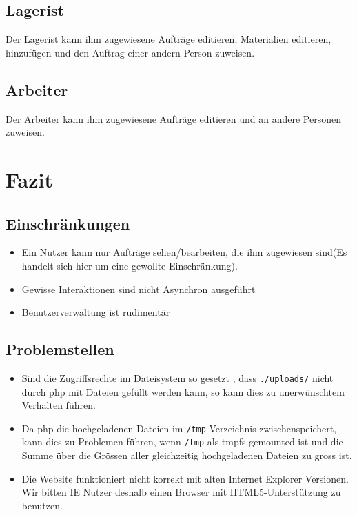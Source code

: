 \documentclass[ngerman, 12pt, pdftex]{scrartcl}[2006/07/30]
\begin{document}
\subsection{Lagerist}
Der Lagerist kann ihm zugewiesene Aufträge editieren, Materialien editieren, hinzufügen und den Auftrag einer andern Person zuweisen.


\subsection{Arbeiter}
Der Arbeiter kann ihm zugewiesene Aufträge editieren und an andere Personen zuweisen.


\section{Fazit}
\subsection{Einschränkungen}
\begin{itemize}
\item Ein Nutzer kann nur Aufträge sehen/bearbeiten, die ihm zugewiesen sind(Es handelt sich hier um eine gewollte Einschränkung).
\item Gewisse Interaktionen sind nicht Asynchron ausgeführt
\item Benutzerverwaltung ist rudimentär
\end{itemize}


\subsection{Problemstellen}
\begin{itemize}
\item Sind die Zugriffsrechte im Dateisystem so gesetzt , dass \verb+./uploads/+ nicht durch php mit Dateien gefüllt werden kann, so kann dies zu unerwünschtem Verhalten führen.
\item Da php die hochgeladenen Dateien im \verb+/tmp+ Verzeichnis zwischenspeichert, kann dies zu Problemen führen, wenn \verb+/tmp+ als tmpfs gemounted ist und die Summe über die Grössen aller gleichzeitig hochgeladenen Dateien zu gross ist.
\item Die Website funktioniert nicht korrekt mit alten Internet Explorer Versionen. Wir bitten IE Nutzer deshalb einen Browser mit HTML5-Unterstützung zu benutzen.

\end{itemize}
\end{document}
